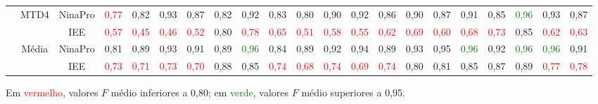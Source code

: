 \begin{sidewaystable}[htb]
{\begin{tabular}{cc|c|ccccccccccccccccc|c}
			\cline{2-21}                                                                                                                                                             
			& \multirow{2}{*}{MTD4}	& NinaPro	&\textcolor{red}{0,77}&	0,82&	0,93&	0,87&	0,82&	0,92&	0,83&	0,80&	0,90&	0,92&	0,86&	0,90&	0,87&	0,91&	0,85&		\textcolor{green}{0,96}&	0,93&	0,87\\
			&						& IEE		&\textcolor{red}{0,57}	&\textcolor{red}{0,45}	&\textcolor{red}{0,46}	&\textcolor{red}{0,52}	&0,80	&	\textcolor{red}{0,78}	&\textcolor{red}{0,65}	&\textcolor{red}{0,51}	&\textcolor{red}{0,58}	&\textcolor{red}{0,55}	&\textcolor{red}{0,62}			&\textcolor{red}{0,69}	&\textcolor{red}{0,60}	&\textcolor{red}{0,68}	&	\textcolor{red}{0,73}	&0,85	&\textcolor{red}{0,62}	&\textcolor{red}{0,63}\\
			\midrule
			
			&\multirow{2}{*}{Média} & NinaPro	& 0,81&	0,89&	0,93&	0,91&	0,89&	\textcolor{green}{0,96}&	0,84&	0,89&	0,92&	0,94&	0,89&	0,93&	0,95&	\textcolor{green}{0,96}&	0,92&	\textcolor{green}{0,96}&	\textcolor{green}{0,96}&	0,91\\
			&						& IEE		&	\textcolor{red}{0,73}	&	\textcolor{red}{0,71}	&	\textcolor{red}{0,73}	&	\textcolor{red}{0,70}	&0,88	&0,85	&	\textcolor{red}{0,74}	&\textcolor{red}{0,68}	&	\textcolor{red}{0,74}	&\textcolor{red}{0,69}	&	\textcolor{red}{0,74}	&0,80	&0,81	&0,85	&0,87	&0,89	&	\textcolor{red}{0,77}	&	\textcolor{red}{0,78}\\
			\bottomrule
		\end{tabular}
	}{
	Em \textcolor{red}{vermelho}, valores $F$ médio inferiores a 0,80;
	em \textcolor{green}{verde}, valores $F$ médio superiores a 0,95.
	}
\end{sidewaystable}
